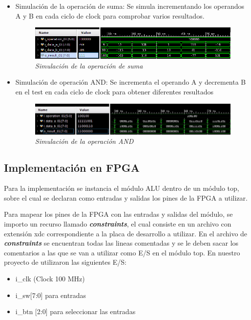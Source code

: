 \documentclass[12pt,A4paper,titlepage]{article}
\begin{document}
\begin{itemize}
	\item Simulación de la operación de suma: Se simula incrementando los operandos A y B en cada ciclo de clock para comprobar varios resultados. 
	
	\begin{figure}[H] 
		\centering
		\includegraphics[scale=0.6]{figure/test-suma.png}
		\caption{\textit{Simulación de la operación de suma}}
	\end{figure}
	\item Simulación de operación AND: Se incrementa el operando A y decrementa B en el test en cada ciclo de clock para obtener diferentes resultados
	
	\begin{figure}[H] 
		\centering
		\includegraphics[scale=0.6]{figure/test-and.png}
		\caption{\textit{Simulación de la operación AND}}
	\end{figure}

\end{itemize}


\subsection{Implementación en FPGA}
Para la implementación se instancia el módulo ALU dentro de un módulo top, sobre el cual se declaran como entradas y salidas los pines de la FPGA a utilizar. 

Para mapear los pines de la FPGA con las entradas y salidas del módulo, se importo un recurso llamado \textbf{\textit{constraints}}, el cual consiste en un archivo con extensión xdc correspondiente a la placa de desarrollo a utilizar. En el archivo de \textbf{\textit{constraints}} se encuentran todas las lineas comentadas y se le deben sacar los comentarios a las que se van a utilizar como E/S en el módulo top. En nuestro proyecto de utilizaron las siguientes E/S:
\begin{itemize}
	\item i\_clk (Clock 100 MHz)
	\item i\_sw[7:0] para entradas
	\item i\_btn [2:0] para seleccionar las entradas
\end{itemize}
\end{document}
